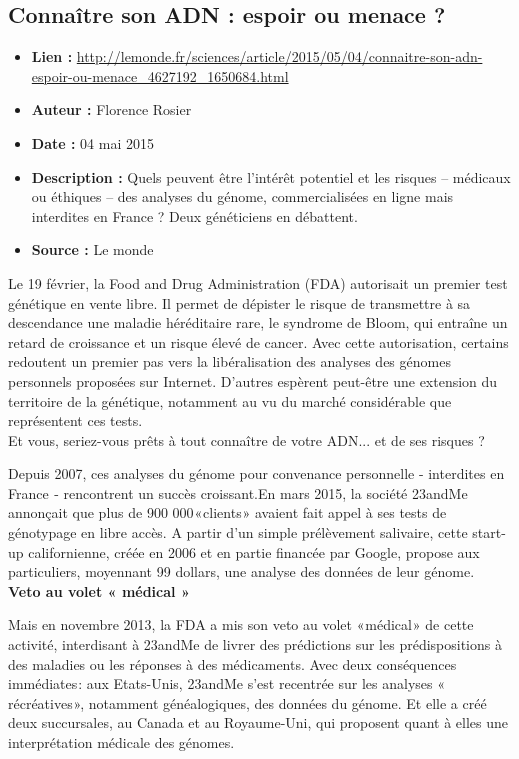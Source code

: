 \documentclass[8pt]{article}
\begin{document}
\subsection{Connaître son ADN : espoir ou menace ?}

\begin{itemize}
	\item \textbf{Lien : }  \url{http://lemonde.fr/sciences/article/2015/05/04/connaitre-son-adn-espoir-ou-menace_4627192_1650684.html} 
	\item \textbf{Auteur : } Florence Rosier
	\item \textbf{Date : } 04 mai 2015
	\item \textbf{Description : } Quels peuvent être l’intérêt potentiel et les risques – médicaux ou éthiques – des analyses du génome, commercialisées en ligne mais interdites en France ? Deux généticiens en débattent.
	\item \textbf{Source : } Le monde
\end{itemize}

Le 19 février, la Food and Drug Administration (FDA) autorisait un premier test génétique en vente libre. Il permet de dépister le risque de transmettre à sa descendance une maladie héréditaire rare, le syndrome de Bloom, qui entraîne un retard de croissance et un risque élevé de cancer. Avec cette autorisation, certains redoutent un premier pas vers la libéralisation des analyses des génomes personnels proposées sur Internet. D’autres espèrent peut-être une extension du territoire de la génétique, notamment au vu du marché considérable que représentent ces tests. \\

Et vous, seriez-vous prêts à tout connaître de votre ADN... et de ses risques ?

Depuis 2007, ces analyses du génome pour convenance personnelle - interdites en France  - rencontrent un succès croissant.En mars 2015, la société 23andMe annonçait que plus de 900 000 « clients » avaient fait appel à ses tests de génotypage en libre accès. A partir d’un simple prélèvement salivaire, cette start-up californienne, créée en 2006 et en partie financée par Google, propose aux particuliers, moyennant 99 dollars, une analyse des données de leur génome. \\

\textbf{Veto au volet « médical »}

Mais en novembre 2013, la FDA a mis son veto au volet « médical » de cette activité, interdisant à 23andMe de livrer des prédictions sur les prédispositions à des maladies ou les réponses à des médicaments. Avec deux conséquences immédiates : aux Etats-Unis, 23andMe s’est recentrée sur les analyses « récréatives », notamment généalogiques, des données du génome. Et elle a créé deux succursales, au Canada et au Royaume-Uni, qui proposent quant à elles une interprétation médicale des génomes. \\
\end{document}
